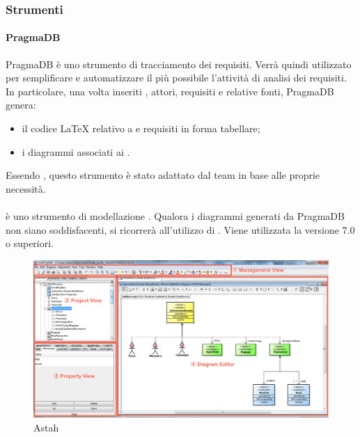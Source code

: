 \subsubsection{Strumenti}
 \paragraph{PragmaDB} 
  PragmaDB è uno strumento  di tracciamento dei requisiti. Verrà quindi utilizzato per semplificare e automatizzare il più possibile l'attività di analisi dei requisiti. In particolare, una volta inseriti , attori, requisiti e relative fonti, PragmaDB genera: 
  \begin{itemize}
  \item il codice \LaTeX{} relativo a  e requisiti in forma tabellare;
  \item i diagrammi  associati ai .
  \end{itemize}
  Essendo , questo strumento è stato adattato dal team \GRUPPO{} in base alle proprie necessità.
  \paragraph{}
   è uno strumento di modellazione . Qualora i diagrammi  generati da PragmaDB non siano soddisfacenti, si ricorrerà all'utilizzo di . Viene utilizzata la versione 7.0 o superiori.
\begin{figure}[h]
\centering
\includegraphics[scale=0.3]{img/astah.png}
\caption{Astah}\label{sec:Figura1}
\end{figure}

\newpage


  
